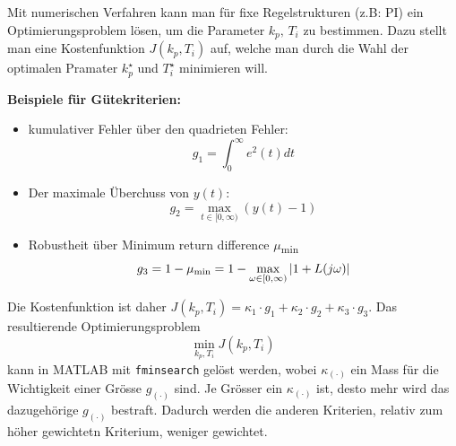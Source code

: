 Mit numerischen Verfahren kann man für fixe Regelstrukturen (z.B: PI) ein Optimierungsproblem lösen, um die Parameter $k_p,\, T_i$ zu bestimmen. Dazu stellt man eine Kostenfunktion $J(k_p,T_i)$ auf, welche man durch die Wahl der optimalen Pramater $k_p^\star$ und $T_i^\star$ minimieren will.

\textbf{Beispiele für Gütekriterien:}
\begin{itemize}
    \item kumulativer Fehler über den quadrieten Fehler:
        \begin{equation*}
            g_1 = \int_0^\infty e^2(t)dt
        \end{equation*}
    
    \item Der maximale Überchuss von $y(t)$:
        \begin{equation*}
            g_2 = \max_{t\in[0,\infty)}(y(t)-1)
        \end{equation*}
    
    \item Robustheit über Minimum return difference $\mu$\textsubscript{min}
        \begin{equation*}
            g_3 = 1 -\mu_{\textnormal{min}} = 1 - \max_{\omega\in[0,\infty)}|1 + L(j\omega)|
        \end{equation*}
\end{itemize}

Die Kostenfunktion ist daher $J(k_p,T_i) = \kappa_1\cdot g_1 + \kappa_2\cdot g_2 + \kappa_3\cdot g_3$. Das resultierende Optimierungsproblem 
\begin{equation*}
    \min_{k_p,T_i}J(k_p,T_i)    
\end{equation*}
kann in MATLAB mit \texttt{fminsearch} gelöst werden, wobei $\kappa_{(\cdot)}$ ein Mass für die Wichtigkeit einer Grösse $g_{(\cdot)}$ sind. Je Grösser ein $\kappa_{(\cdot)}$ ist, desto mehr wird das dazugehörige $g_{(\cdot)}$ bestraft. Dadurch werden die anderen Kriterien, relativ zum höher gewichtetn Kriterium, weniger gewichtet.


